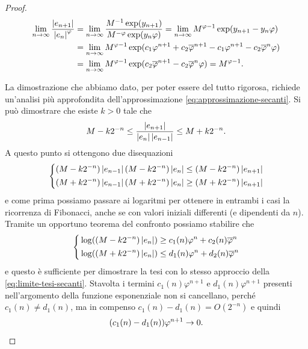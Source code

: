 \begin{proof}
\begin{equation}
\begin{aligned}
\lim_{n \to \infty} \frac{\left\lvert e_{n+1}\right\rvert}{\left\lvert e_n\right\rvert^\varphi}
&= \lim_{n \to \infty} \frac{ M^{-1}       \exp(y_{n+1}) }
                           { M^{-\varphi} \exp(y_n \varphi) }
 = \lim_{n \to \infty} M^{\varphi-1} \exp(y_{n+1}-y_n \varphi) \\
&= \lim_{n \to \infty} M^{\varphi-1}
	\exp(c_1 \varphi^{n+1} + c_2 \overline{\varphi}^{n+1} -
	     c_1 \varphi^{n+1} - c_2 \overline{\varphi}^n \varphi) \\
&= \lim_{n \to \infty} M^{\varphi-1}
	\exp(c_2 \overline{\varphi}^{n+1} - c_2 \overline{\varphi}^n \varphi)
 = M^{\varphi-1}.
\end{aligned}
\end{equation}

La dimostrazione che abbiamo dato, per poter essere del tutto rigorosa,
richiede un'analisi più approfondita dell'approssimazione
\eqref{eq:approssimazione-secanti}.
Si può dimostrare che esiste $k > 0$ tale che
\begin{equation} \label{eq:stima-asintotica-secanti}
M - k 2^{-n}
\leq \frac{\left\lvert e_{n+1}\right\rvert}{\left\lvert e_n\right\rvert \left\lvert e_{n-1}\right\rvert}
\leq M + k 2^{-n}.
\end{equation}
A questo punto si ottengono due disequazioni
\[
\left\{
\begin{aligned}
& (M - k 2^{-n}) \left\lvert e_{n-1}\right\rvert (M - k 2^{-n}) \left\lvert e_n\right\rvert
	\leq (M - k 2^{-n}) \left\lvert e_{n+1}\right\rvert \\
& (M + k 2^{-n}) \left\lvert e_{n-1}\right\rvert (M + k 2^{-n}) \left\lvert e_n\right\rvert
	\geq (M + k 2^{-n}) \left\lvert e_{n+1}\right\rvert
\end{aligned}
\right.
\]
e come prima possiamo passare ai logaritmi per ottenere in entrambi
i casi la ricorrenza di Fibonacci, anche se con valori iniziali differenti
(e dipendenti da $n$). Tramite un opportuno teorema del confronto
possiamo stabilire che
\[
\left\{
\begin{aligned}
& \log((M - k 2^{-n}) \left\lvert e_n\right\rvert) \geq c_1(n) \varphi^n + c_2(n) \overline{\varphi}^n \\
& \log((M + k 2^{-n}) \left\lvert e_n\right\rvert) \leq d_1(n) \varphi^n + d_2(n) \overline{\varphi}^n
\end{aligned}
\right.
\]
e questo è sufficiente per dimostrare la tesi con
lo stesso approccio della \eqref{eq:limite-tesi-secanti}.
Stavolta i termini $c_1(n) \varphi^{n+1}$ e $d_1(n) \varphi^{n+1}$
presenti nell'argomento della funzione esponenziale
non si cancellano, perché $c_1(n) \neq d_1(n)$, ma in compenso
$c_1(n) - d_1(n) = O(2^{-n})$ e quindi
\[
(c_1(n)-d_1(n))\varphi^{n+1} \to 0. \qedhere
\]
\end{proof}

